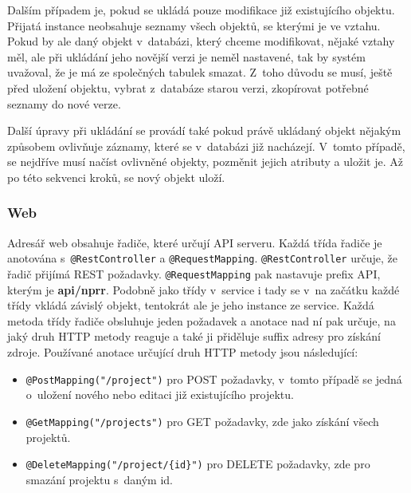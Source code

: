 Dalším případem je, pokud se ukládá pouze modifikace již existujícího objektu. Přijatá instance neobsahuje seznamy všech objektů, se kterými je ve vztahu. Pokud by ale daný objekt v~databázi, který chceme modifikovat, nějaké vztahy měl, ale při ukládání jeho novější verzi je neměl nastavené, tak by systém uvažoval, že je má ze společných tabulek smazat. Z~toho důvodu se musí, ještě před uložení objektu, vybrat z~databáze starou verzi, zkopírovat potřebné seznamy do nové verze.

Další úpravy při ukládání se provádí také pokud právě ukládaný objekt nějakým způsobem ovlivňuje záznamy, které se v~databázi již nacházejí. V~tomto případě, se nejdříve musí načíst ovlivněné objekty, pozměnit jejich atributy a uložit je. Až po této sekvenci kroků, se nový objekt uloží.


\subsubsection *{Web}

Adresář web obsahuje řadiče, které určují API serveru. Každá třída řadiče je anotována s~\texttt{@RestController} a \texttt{@RequestMapping}. \texttt{@RestController} určuje, že řadič přijímá REST požadavky. \texttt{@RequestMapping} pak nastavuje prefix API, kterým je \textbf{api/nprr}. Podobně jako třídy v~service i tady se v~na začátku každé třídy vkládá závislý objekt, tentokrát ale je jeho instance ze service. Každá metoda třídy řadiče obsluhuje jeden požadavek a anotace nad ní pak určuje, na jaký druh HTTP metody reaguje a také ji přiděluje suffix adresy pro získání zdroje. Používané anotace určující druh HTTP metody jsou následující:

\begin{itemize}
    \item \texttt{@PostMapping("/project")} pro POST požadavky, v~tomto případě se jedná o~uložení nového nebo editaci již existujícího projektu.
    \item \texttt{@GetMapping("/projects")} pro GET požadavky, zde jako získání všech projektů.
    \item \texttt{@DeleteMapping("/project/\{id\}")} pro DELETE požadavky, zde pro smazání projektu s~daným id.
\end{itemize}

